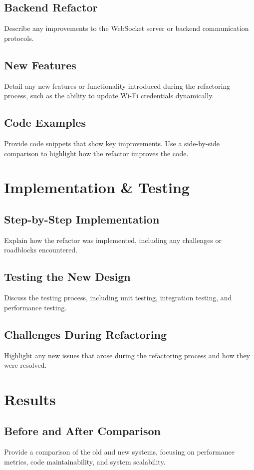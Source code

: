 \documentclass[twocolumn]{article}
\begin{document}
\subsection{Backend Refactor}
Describe any improvements to the WebSocket server or backend communication protocols.

\subsection{New Features}
Detail any new features or functionality introduced during the refactoring process, such as the ability to update Wi-Fi credentials dynamically.

\subsection{Code Examples}
Provide code snippets that show key improvements. Use a side-by-side comparison to highlight how the refactor improves the code.

\newpage

\section{Implementation \& Testing}
\subsection{Step-by-Step Implementation}
Explain how the refactor was implemented, including any challenges or roadblocks encountered.

\subsection{Testing the New Design}
Discuss the testing process, including unit testing, integration testing, and performance testing.

\subsection{Challenges During Refactoring}
Highlight any new issues that arose during the refactoring process and how they were resolved.

\section{Results}
\subsection{Before and After Comparison}
Provide a comparison of the old and new systems, focusing on performance metrics, code maintainability, and system scalability.
\end{document}
